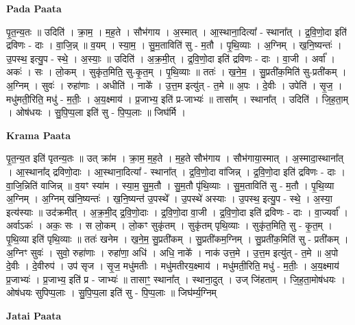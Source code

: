 \documentclass[17pt]{extarticle}
\begin{document}
\textbf{Pada Paata} \newline

पृ॒त॒न्य॒तः ॥ उदिति॑ । क्रा॒म॒ । म॒ह॒ते । सौभ॑गाय । अ॒स्मात् । आ॒स्थाना॒दित्या᳚ - स्थाना᳚त् । द्र॒वि॒णो॒दा इति॑ द्रविणः - दाः । वा॒जि॒न्न् ॥ व॒यम् । स्या॒म॒ । सु॒म॒ताविति॑ सु - म॒तौ । पृ॒थि॒व्याः । अ॒ग्निम् । ख॒नि॒ष्यन्तः॑ । उ॒पस्थ॒ इत्यु॒प - स्थे॒ । अ॒स्याः॒ ॥ उदिति॑ । अ॒क्र॒मी॒त् । द्र॒वि॒णो॒दा इति॑ द्रविणः - दाः । वा॒जी । अर्वा᳚ । अकः॑ । सः । लो॒कम् । सुकृ॑त॒मिति॒ सु-कृ॒त॒म् । पृ॒थि॒व्याः ॥ ततः॑ । ख॒ने॒म॒ । सु॒प्रती॑क॒मिति॑ सु-प्रती॑कम् । अ॒ग्निम् । सुवः॑ । रुहा॑णाः । अधीति॑ । नाके᳚ । उ॒त्त॒म इत्यु॑त् - त॒मे ॥ अ॒पः । दे॒वीः । उपेति॑ । सृ॒ज॒ । मधु॑मती॒रिति॒ मधु॑ - म॒तीः॒ । अ॒य॒क्ष्माय॑ । प्र॒जाभ्य॒ इति॑ प्र-जाभ्यः॑ ॥ तासा᳚म् । स्थाना᳚त् । उदिति॑ । जि॒ह॒ता॒म् । ओष॑धयः । सु॒पि॒प्प॒ला इति॑ सु - पि॒प्प॒लाः ॥ जिघ॑र्मि ।  \newline


\textbf{Krama Paata} \newline

पृ॒त॒न्य॒त इति॑ पृतन्य॒तः ॥ उत् क्रा॑म । क्रा॒म॒ म॒ह॒ते । म॒ह॒ते सौभ॑गाय । सौभ॑गाया॒स्मात् । अ॒स्मादा॒स्थाना᳚त् । आ॒स्थाना᳚द् द्रविणो॒दाः । आ॒स्थाना॒दित्या᳚ - स्थाना᳚त् । द्र॒वि॒णो॒दा वा॑जिन्न् । द्र॒वि॒णो॒दा इति॑ द्रविणः - दाः । वा॒जि॒न्निति॑ वाजिन्न् ॥ व॒यꣳ स्या॑म । स्या॒म॒ सु॒म॒तौ । सु॒म॒तौ पृ॑थि॒व्याः । सु॒म॒ताविति॑ सु - म॒तौ । पृ॒थि॒व्या अ॒ग्निम् । अ॒ग्निम् ख॑नि॒ष्यन्तः॑ । ख॒नि॒ष्यन्त॑ उ॒पस्थे᳚ । उ॒पस्थे॑ अस्याः । उ॒पस्थ॒ इत्यु॒प - स्थे॒ । अ॒स्या॒ इत्य॑स्याः ॥ उद॑क्रमीत् । अ॒क्र॒मी॒द् द्र॒वि॒णो॒दाः । द्र॒वि॒णो॒दा वा॒जी । द्र॒वि॒णो॒दा इति॑ द्रविणः - दाः । वा॒ज्यर्वा᳚ । अर्वाऽकः॑ । अकः॒ सः । स लो॒कम् । लो॒कꣳ सुकृ॑तम् । सुकृ॑तम् पृथि॒व्याः । सुकृ॑त॒मिति॒ सु - कृ॒त॒म् । पृ॒थि॒व्या इति॑ पृथि॒व्याः ॥ ततः॑ खनेम । ख॒ने॒म॒ सु॒प्रती॑कम् । सु॒प्रती॑कम॒ग्निम् । सु॒प्रती॑क॒मिति॑ सु - प्रती॑कम् । अ॒ग्निꣳ सुवः॑ । सुवो॒ रुहा॑णाः । रुहा॑णा॒ अधि॑ । अधि॒ नाके᳚ । नाक॑ उत्त॒मे । उ॒त्त॒म इत्यु॑त् - त॒मे ॥ अ॒पो दे॒वीः । दे॒वीरुप॑ । उप॑ सृज । सृ॒ज॒ मधु॑मतीः । मधु॑मतीरय॒क्ष्माय॑ । मधु॑मती॒रिति॒ मधु॑ - म॒तीः॒ । अ॒य॒क्ष्माय॑ प्र॒जाभ्यः॑ । प्र॒जाभ्य॒ इति॑ प्र - जाभ्यः॑ ॥ तासाꣳ॒॒ स्थाना᳚त् । स्थाना॒दुत् । उज् जि॑हताम् । जि॒ह॒ता॒मोष॑धयः । ओष॑धयः सुपिप्प॒लाः । सु॒पि॒प्प॒ला इति॑ सु - पि॒प्प॒लाः ॥ जिघ॑र्म्य॒ग्निम् \newline

\textbf{Jatai Paata} \newline
\end{document}
